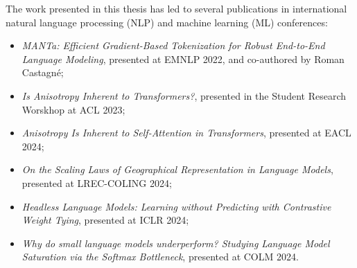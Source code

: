 The work presented in this thesis has led to several publications in international natural language processing (NLP) and machine learning (ML) conferences:
\begin{itemize}
    \item \textit{MANTa: Efficient Gradient-Based Tokenization for Robust End-to-End Language Modeling}, presented at EMNLP 2022, and co-authored by Roman Castagné;
    \item \textit{Is Anisotropy Inherent to Transformers?}, presented in the Student Research Worskhop at ACL 2023;
    \item \textit{Anisotropy Is Inherent to Self-Attention in Transformers}, presented at EACL 2024;
    \item \textit{On the Scaling Laws of Geographical Representation in Language Models}, presented at LREC-COLING 2024;
    \item \textit{Headless Language Models: Learning without Predicting with Contrastive Weight Tying}, presented at ICLR 2024;
    \item \textit{Why do small language models underperform? Studying Language Model Saturation via the Softmax Bottleneck}, presented at COLM 2024.
\end{itemize}